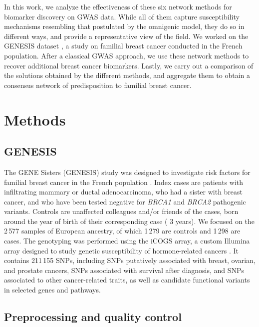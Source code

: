 \documentclass[draft,twocolumn, 11pt]{article}
\begin{document}
In this work, we analyze the effectiveness of these six network methods for biomarker discovery on GWAS data. While all of them capture susceptibility mechanisms resembling that postulated by the omnigenic model, they do so in different ways, and provide a representative view of the field. We worked on the GENESIS dataset \cite{sinilnikova_genesis:_2016}, a study on familial breast cancer conducted in the French population. After a classical GWAS approach, we use these network methods to recover additional breast cancer biomarkers. Lastly, we carry out a comparison of the solutions obtained by the different methods, and aggregate them to obtain a consensus network of predisposition to familial breast cancer. 

\section{Methods}
\subsection{GENESIS}

The GENE Sisters (GENESIS) study was designed to investigate risk factors for familial breast cancer in the French population \cite{sinilnikova_genesis:_2016}. Index cases are patients with infiltrating mammary or ductal adenocarcinoma, who had a sister with breast cancer, and who have been tested negative for \emph{BRCA1} and \emph{BRCA2} pathogenic variants. Controls are unaffected colleagues and/or friends of the cases, born around the year of birth of their corresponding case (\textpm{} 3 years). We focused on the 2\,577 samples of European ancestry, of which 1\,279 are controls and 1\,298 are cases. The genotyping was performed using the iCOGS array, a custom Illumina array designed to study genetic susceptibility of hormone-related cancers \cite{sakoda_turning_2013}. It contains 211\,155 SNPs, including SNPs putatively associated with breast, ovarian, and prostate cancers, SNPs associated with survival after diagnosis, and SNPs associated to other cancer-related traits, as well as candidate functional variants in selected genes and pathways.

\subsection{Preprocessing and quality control}
\end{document}
